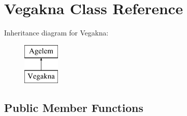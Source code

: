 \hypertarget{class_vegakna}{}\section{Vegakna Class Reference}
\label{class_vegakna}
Inheritance diagram for Vegakna\+:\begin{figure}[H]
\begin{center}
\leavevmode
\includegraphics[height=2.000000cm]{class_vegakna}
\end{center}
\end{figure}
\subsection*{Public Member Functions}
